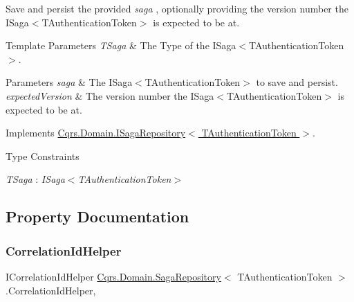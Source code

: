 Save and persist the provided {\itshape saga} , optionally providing the version number the I\+Saga$<$\+T\+Authentication\+Token$>$ is expected to be at. 


\begin{DoxyTemplParams}{Template Parameters}
{\em T\+Saga} & The Type of the I\+Saga$<$\+T\+Authentication\+Token$>$.\\
\hline
\end{DoxyTemplParams}

\begin{DoxyParams}{Parameters}
{\em saga} & The I\+Saga$<$\+T\+Authentication\+Token$>$ to save and persist.\\
\hline
{\em expected\+Version} & The version number the I\+Saga$<$\+T\+Authentication\+Token$>$ is expected to be at.\\
\hline
\end{DoxyParams}


Implements \hyperlink{interfaceCqrs_1_1Domain_1_1ISagaRepository_ad539cdc70f3168d0335c9510742e25cd_ad539cdc70f3168d0335c9510742e25cd}{Cqrs.\+Domain.\+I\+Saga\+Repository$<$ T\+Authentication\+Token $>$}.

\begin{Desc}
\item[Type Constraints]\begin{description}
\item[{\em T\+Saga} : {\em I\+Saga$<$T\+Authentication\+Token$>$}]\end{description}
\end{Desc}


\subsection{Property Documentation}
\mbox{\label{classCqrs_1_1Domain_1_1SagaRepository_a654f9f7c2130864d63515f1504a750fd_a654f9f7c2130864d63515f1504a750fd}} 
\subsubsection{\texorpdfstring{Correlation\+Id\+Helper}{CorrelationIdHelper}}
{\footnotesize\ttfamily I\+Correlation\+Id\+Helper \hyperlink{classCqrs_1_1Domain_1_1SagaRepository}{Cqrs.\+Domain.\+Saga\+Repository}$<$ T\+Authentication\+Token $>$.Correlation\+Id\+Helper\hspace{0.3cm}{\ttfamily [get]}, {\ttfamily [protected]}}



